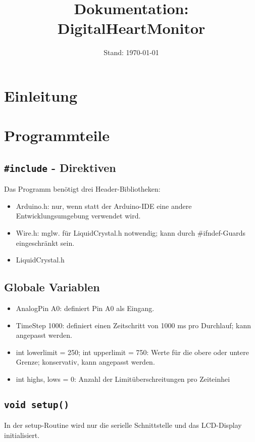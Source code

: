 \documentclass[10pt, a4paper]{article}
\title{Dokumentation: DigitalHeartMonitor}
\author{}
\date{Stand: \today}
\begin{document}
\maketitle

\tableofcontents

\section{Einleitung}

\section{Programmteile}

\subsection{\texttt{\#include} - Direktiven}
Das Programm benötigt drei Header-Bibliotheken:
\begin{itemize}
	\item Arduino.h: nur, wenn statt der Arduino-IDE eine andere Entwicklungsumgebung verwendet wird.
	\item Wire.h: mglw. für LiquidCrystal.h notwendig; kann durch \#ifndef-Guards eingeschränkt sein.
	\item LiquidCrystal.h
\end{itemize}	

\subsection{Globale Variablen}
\begin{itemize}
	\item AnalogPin A0: definiert Pin A0 als Eingang.
	\item TimeStep 1000: definiert einen Zeitschritt von 1000 ms pro Durchlauf; kann angepasst werden.
	\item int lowerlimit = 250; int upperlimit = 750: Werte für die obere oder untere Grenze; konservativ, kann angepasst werden.
	\item int highs, lows = 0: Anzahl der Limitüberschreitungen pro Zeiteinhei
\end{itemize}

\subsection{\texttt{void setup()}}
In der setup-Routine wird nur die serielle Schnittstelle und das LCD-Display initialisiert.
\end{document}

